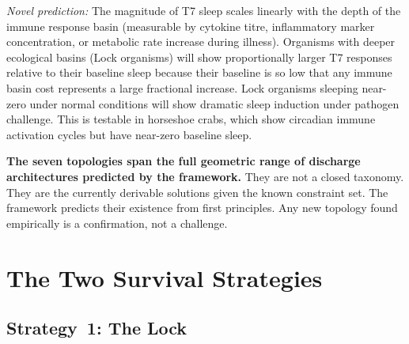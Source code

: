 \documentclass[10pt, a4paper]{article}
\begin{document}
\begin{mdframed}[
  backgroundcolor=newbox,
  linecolor=headergreen,
  linewidth=0.8pt,
  innertopmargin=0.6em,
  innerbottommargin=0.6em,
  innerleftmargin=0.8em,
  innerrightmargin=0.8em
]
\textit{Novel prediction:} The magnitude
of T7 sleep scales linearly with the
depth of the immune response basin
(measurable by cytokine titre,
inflammatory marker concentration, or
metabolic rate increase during illness).
Organisms with deeper ecological basins
(Lock organisms) will show proportionally
larger T7 responses relative to their
baseline sleep because their baseline
is so low that any immune basin cost
represents a large fractional increase.
Lock organisms sleeping near-zero under
normal conditions will show dramatic
sleep induction under pathogen challenge.
This is testable in horseshoe crabs, which
show circadian immune activation cycles
but have near-zero baseline sleep.
\end{mdframed}

\vspace{0.6em}

\textbf{The seven topologies span the
full geometric range of discharge
architectures predicted by the
framework.} They are not a closed
taxonomy. They are the currently derivable
solutions given the known constraint set.
The framework predicts their existence
from first principles. Any new topology
found empirically is a confirmation,
not a challenge.

\section{The Two Survival Strategies}
\label{sec:strategies}

\subsection{Strategy~1: The Lock}
\end{document}
